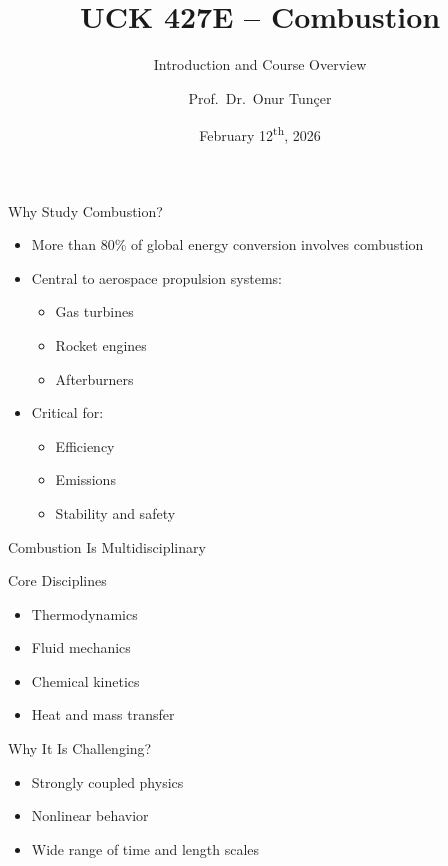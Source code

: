 \documentclass[aspectratio=169]{beamer}
\title[Combustion]{UCK 427E -- Combustion}
\subtitle{Introduction and Course Overview}
\author{Prof.\ Dr.\ Onur Tun\c{c}er}
\institute{Istanbul Technical University}
\date{February 12\textsuperscript{th}, 2026}
\begin{document}
\begin{frame}
  \titlepage
\end{frame}

\begin{frame}{Why Study Combustion?}
\begin{itemize}
  \item More than 80\% of global energy conversion involves combustion
  \item Central to aerospace propulsion systems:
  \begin{itemize}
    \item Gas turbines
    \item Rocket engines
    \item Afterburners
  \end{itemize}
  \item Critical for:
  \begin{itemize}
    \item Efficiency
    \item Emissions
    \item Stability and safety
  \end{itemize}
\end{itemize}
\end{frame}

\begin{frame}{Combustion Is Multidisciplinary}

\begin{block}{Core Disciplines}
\begin{itemize}
  \item Thermodynamics
  \item Fluid mechanics
  \item Chemical kinetics
  \item Heat and mass transfer
\end{itemize}
\end{block}

\pause

\begin{block}{Why It Is Challenging?}
\begin{itemize}
  \item Strongly coupled physics
  \item Nonlinear behavior
  \item Wide range of time and length scales
\end{itemize}
\end{block}
\end{frame}
\end{document}
